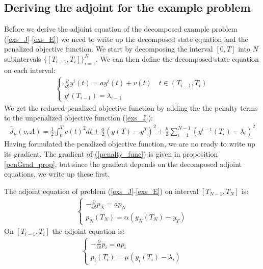 \subsection{Deriving the adjoint for the example problem}
Before we derive the adjoint equation of the decomposed example problem (\ref{exs_J}-\ref{exs_E}) we need to write up the decomposed state equation and the penalized objective function. We start by decomposing the interval $[0,T]$ into $N$ subintervals $\{[T_{i-1},T_{i}]\}_{i=1}^{N}$. We can then define the decomposed state equation on each interval:
\begin{align}
\left\{
     \begin{array}{lr}
       	\frac{\partial}{\partial t} y^i(t)=a y^i(t) + v(t) \quad t\in(T_{i-1},T_{i})\\
       	y^i(T_{i-1})=\lambda_{i-1}
     \end{array}
   \right. \label{decomp_E}
\end{align}
We get the reduced penalized objective function by adding the the penalty terms to the unpenalized objective function (\ref{exs_J}):
\begin{align}
\hat J_{\mu}(v,\Lambda) = \frac{1}{2}\int_0^Tv(t)^2dt + \frac{\alpha}{2}(y(T)-y^T)^2 + \frac{\mu}{2}\sum_{i=1}^{N-1}(y^{i-1}(T_i)-\lambda_i)^2 \label{penalty_func}
\end{align}
Having formulated the penalized objective function, we are no ready to write up its gradient. The gradient of (\ref{penalty_func}) is given in proposition \ref{penGrad_prop}, but since the gradient depends on the decomposed adjoint equations, we write up these first.
\begin{proposition} \label{pen_adjoint_prop}
The adjoint equation of problem (\ref{exs_J}-\ref{exs_E}) on interval $[T_{N-1},T_N]$ is:
\begin{align}
\left\{
     \begin{array}{lr}
	-\frac{\partial }{\partial t}p_N =a p_N  \\
	p_N(T_{N}) = \alpha( y_N(T_{N})-y_T)
	\end{array}
   \right. \label{end adjoint}
\end{align}
On $[T_{i-1},T_i]$ the adjoint equation is:
\begin{align}
\left\{
     \begin{array}{lr}
	-\frac{\partial }{\partial t}p_i =ap_i  \\
	p_i(T_{i}) = \mu(y_{i}(T_{i})-\lambda_{i} )
	\end{array}
   \right. \label{exs_adjoint}
\end{align}
\end{proposition} 
